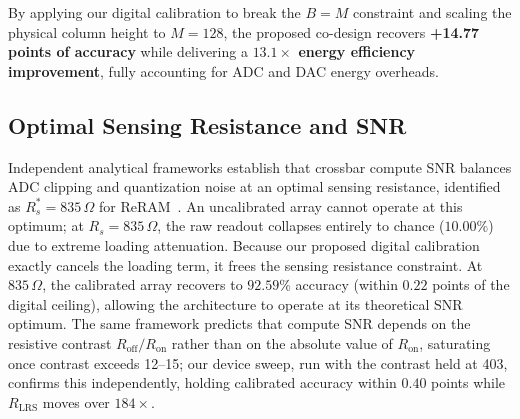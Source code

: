 \documentclass[conference]{IEEEtran}
\begin{document}
By applying our digital calibration to break the $B=M$ constraint and scaling the physical column height to $M=128$, the proposed co-design recovers \textbf{+14.77 points of accuracy} while delivering a \textbf{$13.1\times$ energy efficiency improvement}, fully accounting for ADC and DAC energy overheads.

\begin{table}[H]
    \centering
    \caption{Headline Performance Comparison on CIFAR-10 ResNet-18}
    \label{tab:headline}
\end{table}

\subsection{Optimal Sensing Resistance and SNR}
\label{sec:rsense}
Independent analytical frameworks establish that crossbar compute SNR balances ADC clipping and quantization noise at an optimal sensing resistance, identified as $R_s^* = 835\,\Omega$ for ReRAM~\cite{shanbhag}. An uncalibrated array cannot operate at this optimum; at $R_s = 835\,\Omega$, the raw readout collapses entirely to chance ($10.00\%$) due to extreme loading attenuation. Because our proposed digital calibration exactly cancels the loading term, it frees the sensing resistance constraint. At $835\,\Omega$, the calibrated array recovers to $92.59\%$ accuracy (within $0.22$ points of the digital ceiling), allowing the architecture to operate at its theoretical SNR optimum. The same framework predicts that compute SNR depends on the resistive contrast $R_{\text{off}}/R_{\text{on}}$ rather than on the absolute value of $R_{\text{on}}$, saturating once contrast exceeds 12--15; our device sweep, run with the contrast held at 403, confirms this independently, holding calibrated accuracy within $0.40$ points while $R_{\text{LRS}}$ moves over $184\times$.
\end{document}
